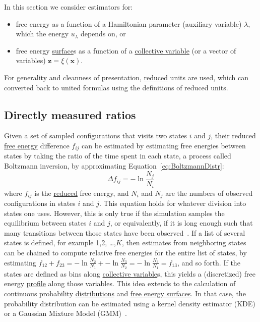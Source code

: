 \documentclass[9pt,review]{livecoms}
\newcommand{\vx}{\mathbf{x}}
\newcommand{\vz}{\mathbf{z}}
\begin{document}
In this section we consider estimators for:
\begin{itemize}
    \item free energy as a function of a Hamiltonian parameter (auxiliary variable) $\lambda$, which the energy $u_\lambda$ depends on, or
    \item free energy \hyperlink{ref:FES} {surface}s as a function of a \hyperlink{ref:CV} {collective variable} (or a vector of variables) $\vz = \xi(\vx)$.
\end{itemize}

For generality and cleanness of presentation, \hyperlink{ref:reduced} {reduced} units are used, which can converted back to united formulas using the definitions of reduced units.

\subsection{Directly measured ratios}

Given a set of sampled configurations that visits two states $i$ and $j$, their reduced \hyperlink{ref:FE} {free energy} difference $f_{ij}$ can be estimated by estimating free energies between states by taking the ratio of the time spent in each state, a process called Boltzmann inversion, by approximating Equation~\eqref{eq:BoltzmannDistr}:
\begin{equation}
\Delta f_{ij} = -\ln \frac{N_j}{N_i}
\label{eq:boltzmann_inversion}
\end{equation}
where $f_{ij}$ is the \hyperlink{ref:reduced} {reduced} free energy, and $N_i$ and $N_j$ are the numbers of observed configurations in states $i$ and $j$.  This equation holds for whatever division into states one uses. However, this is only true if the simulation samples the equilibrium between states $i$ and $j$, or equivalently, if it is long enough such that many transitions between those states have been observed~\cite{No2009}. If a list of several states is defined, for example 1,2, \ldots,$K$, then estimates from neighboring states can be chained to compute relative free energies for the entire list of states, by estimating $f_{12} + f_{23} = -\ln \frac{N_2}{N_1} + -\ln \frac{N_3}{N_2} =   -\ln \frac{N_3}{N_1} = f_{13}$, and so forth. If the states are defined as bins along \hyperlink{ref:CV} {collective variable}s, this yields a (discretized) free energy \hyperlink{ref:FES} {profile} along those variables. This idea extends to the calculation of continuous probability \hyperlink{ref:Distribution} {distributions} and \hyperlink{ref:FES} {free energy surfaces}. In that case, the probability distribution can be estimated using a kernel density estimator (KDE) or a Gaussian Mixture Model (GMM)~\cite{Westerlund2017}.
\end{document}

